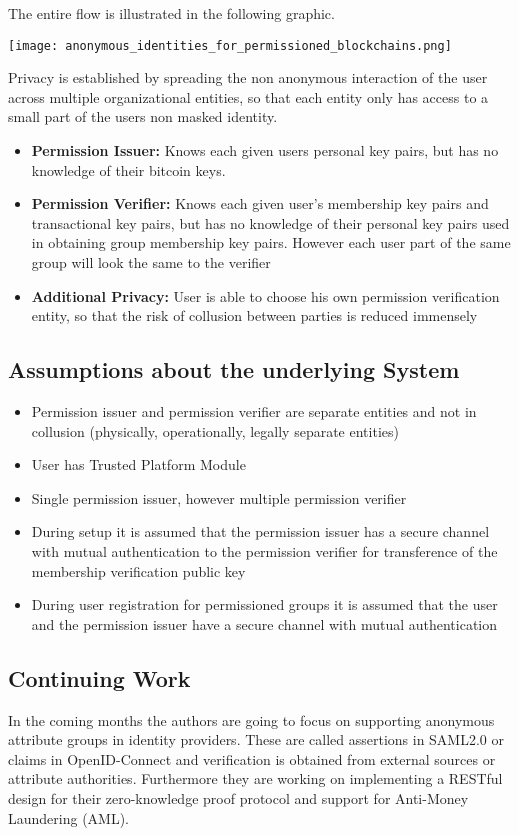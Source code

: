 The entire flow is illustrated in the following graphic.

 \texttt{[image: anonymous\_identities\_for\_permissioned\_blockchains.png]}

Privacy is established by spreading the non anonymous interaction of the user across multiple organizational entities, so that each entity only has access to a small part of the users non masked identity.
\begin{itemize}
\item \textbf{Permission Issuer:}
Knows each given users personal key pairs, but has no knowledge of their bitcoin keys.
\item \textbf{Permission Verifier:}
Knows each given user's membership key pairs and transactional key pairs, but has no knowledge of their personal key pairs used in obtaining group membership key pairs. However each user part of the same group will look the same to the verifier
\item \textbf{Additional Privacy:}
User is able to choose his own permission verification entity, so that the risk of collusion between parties is reduced immensely
\end{itemize}

\subsection{Assumptions about the underlying System}
\begin{itemize}
\item Permission issuer and permission verifier are separate entities and not in collusion (physically, operationally, legally separate entities)
\item User has Trusted Platform Module
\item Single permission issuer, however multiple permission verifier
\item During setup it is assumed that the permission issuer has a secure channel with mutual authentication to the permission verifier for transference of the membership verification public key
\item During user registration for permissioned groups it is assumed that the user and the permission issuer have a secure channel with mutual authentication
\end{itemize}
\subsection{Continuing Work}
In the coming months the authors are going to focus on supporting anonymous attribute groups in identity providers. These are called assertions in SAML2.0 or claims in OpenID-Connect and verification is obtained from external sources or attribute authorities. Furthermore they are working on implementing a RESTful design for their zero-knowledge proof protocol and support for Anti-Money Laundering (AML).


